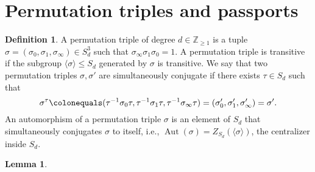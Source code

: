 \documentclass{dcthesis}
\newcommand{\PP}{\mathbb P}
\newcommand{\CC}{\mathbb C}
\newcommand{\QQ}{\mathbb Q}
\newcommand{\ZZ}{\mathbb Z}
\newcommand{\defi}[1]{\textsf{#1}}
\DeclareMathOperator{\Aut}{Aut}
\DeclareMathOperator{\Mon}{Mon}
\DeclareMathOperator{\Gal}{Gal}
\newtheorem{lemma}[prop]{Lemma}
\theoremstyle{definition}
\newtheorem{definition}[prop]{Definition}
\theoremstyle{remark}
\numberwithin{equation}{section}
\numberwithin{figure}{section}
\begin{document}
{  \section{Permutation triples and passports}{\label{sec:passports}
    \begin{definition}
      \label{def:permutationtriple}
      A \defi{permutation triple} of degree $d \in \ZZ_{\geq 1}$ is a tuple $\sigma =
      (\sigma_0,\sigma_1,\sigma_\infty)\in S_d^3$ such that $\sigma_\infty \sigma_1
      \sigma_0 = 1$.
      A permutation triple is \defi{transitive} if the subgroup
      $\langle \sigma \rangle \leq S_d$ generated by $\sigma$ is transitive.
      We say
      that two permutation triples $\sigma,\sigma'$ are \defi{simultaneously
      conjugate} if there exists $\tau\in S_d$ such that
      \begin{equation}\label{eqn:simconj}
        \sigma^\tau \colonequals
        (\tau^{-1}\sigma_0\tau, \tau^{-1}\sigma_1\tau, \tau^{-1}\sigma_\infty\tau)
        = \left(\sigma'_0,\sigma'_1,\sigma'_\infty\right)
        = \sigma'.
      \end{equation}
      An \defi{automorphism} of a permutation triple $\sigma$ is an element of $S_d$ that
      simultaneously conjugates $\sigma$ to itself, i.e.,
      $\Aut(\sigma)=Z_{S_d}(\langle \sigma \rangle)$, the centralizer inside $S_d$.
    \end{definition}
    \begin{lemma}

\end{lemma}}}
\end{document}
